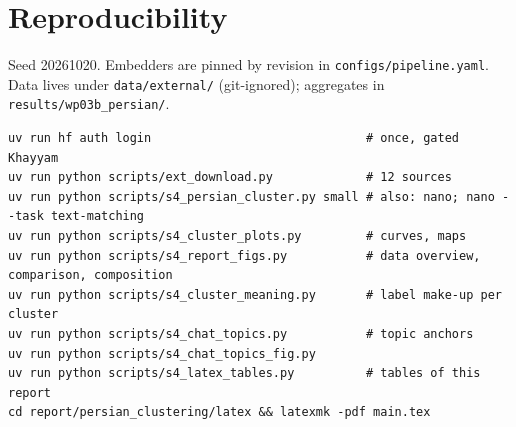 \documentclass[11pt,a4paper]{article}
\begin{document}
\section{Reproducibility}\label{app:repro}
Seed 20261020. Embedders are pinned by revision in \texttt{configs/pipeline.yaml}. Data lives under
\texttt{data/external/} (git-ignored); aggregates in \texttt{results/wp03b\_persian/}.
\begin{small}\begin{verbatim}
uv run hf auth login                              # once, gated Khayyam
uv run python scripts/ext_download.py             # 12 sources
uv run python scripts/s4_persian_cluster.py small # also: nano; nano --task text-matching
uv run python scripts/s4_cluster_plots.py         # curves, maps
uv run python scripts/s4_report_figs.py           # data overview, comparison, composition
uv run python scripts/s4_cluster_meaning.py       # label make-up per cluster
uv run python scripts/s4_chat_topics.py           # topic anchors
uv run python scripts/s4_chat_topics_fig.py
uv run python scripts/s4_latex_tables.py          # tables of this report
cd report/persian_clustering/latex && latexmk -pdf main.tex
\end{verbatim}\end{small}
\end{document}

